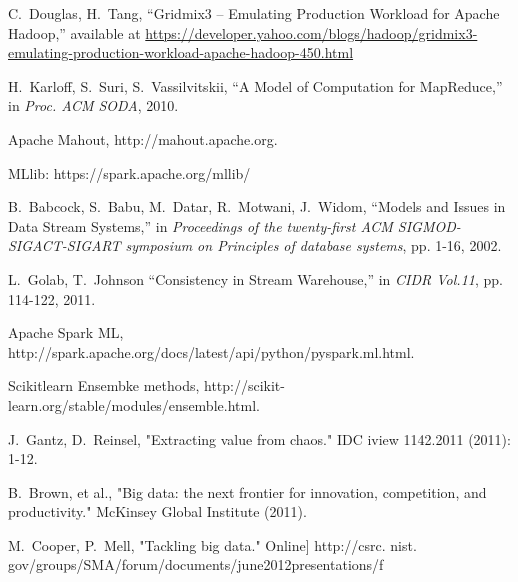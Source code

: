 \documentclass[10pt, conference, letterpaper]{IEEEtran}
\begin{document}
\begin{thebibliography}{99}
C.~Douglas, H.~Tang, ``Gridmix3 -- Emulating Production Workload for Apache Hadoop,'' available at \url{https://developer.yahoo.com/blogs/hadoop/gridmix3-emulating-production-workload-apache-hadoop-450.html}

H.~Karloff, S.~Suri, S.~Vassilvitskii, ``A Model of Computation for MapReduce,'' in \emph{Proc. ACM SODA}, 2010.

Apache Mahout, http://mahout.apache.org.

MLlib: https://spark.apache.org/mllib/

B.~Babcock, S.~Babu, M.~Datar, R.~Motwani, J.~Widom, ``Models and Issues in Data Stream Systems,'' in \emph{Proceedings of the twenty-first ACM SIGMOD-SIGACT-SIGART symposium on Principles of database systems}, pp. 1-16, 2002.

L.~Golab, T.~Johnson ``Consistency in Stream Warehouse,'' in \emph{CIDR Vol.11}, pp. 114-122, 2011.

Apache Spark ML, http://spark.apache.org/docs/latest/api/python/pyspark.ml.html.

Scikitlearn Ensembke methods, http://scikit-learn.org/stable/modules/ensemble.html.

J.~Gantz, D.~Reinsel, "Extracting value from chaos." IDC iview 1142.2011 (2011): 1-12.

B.~Brown, et al., "Big data: the next frontier for innovation, competition, and productivity." McKinsey Global Institute (2011).

M.~Cooper, P.~Mell, "Tackling big data." Online] http://csrc. nist. gov/groups/SMA/forum/documents/june2012presentations/f%

\end{thebibliography}
\end{document}
